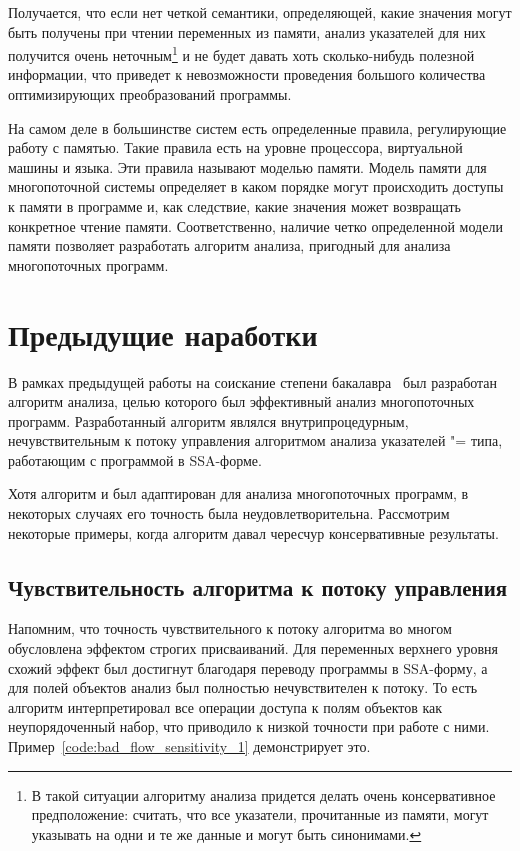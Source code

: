 \documentclass[14pt,titlepage,draft]{extarticle}
\newcommand{\java}{\eng{Java}\xspace}
\newcommand{\subsetbased}{\eng{subset}"=\eng{based}\xspace}
\begin{document}
    Получается, что если нет четкой семантики, определяющей, какие значения
    могут быть получены при чтении переменных из памяти, анализ указателей
    для них получится очень неточным\footnote{
      В такой ситуации алгоритму анализа придется делать очень консервативное
      предположение: считать, что все указатели, прочитанные из памяти, могут
      указывать на одни и те же данные и могут быть синонимами.
    } и не будет давать хоть сколько-нибудь полезной информации, что приведет
    к невозможности проведения большого количества оптимизирующих
    преобразований программы.

    На самом деле в большинстве систем есть определенные правила,
    регулирующие работу с памятью. Такие правила есть на уровне процессора,
    виртуальной машины и языка. Эти правила называют моделью памяти.
    Модель памяти для многопоточной системы определяет в каком
    порядке могут происходить доступы к памяти в программе и, как следствие,
    какие значения может возвращать конкретное чтение памяти. Соответственно,
    наличие четко определенной модели памяти позволяет разработать алгоритм
    анализа, пригодный для анализа многопоточных программ.

  \section{Предыдущие наработки}
    
    В рамках предыдущей работы на соискание степени
    бакалавра~\cite{my_bachelor} был разработан алгоритм анализа, целью
    которого был эффективный анализ многопоточных \java программ.
    Разработанный алгоритм являлся внутрипроцедурным, нечувствительным к
    потоку управления алгоритмом анализа указателей \subsetbased типа,
    работающим с программой в SSA-форме.

    Хотя алгоритм и был адаптирован для анализа многопоточных программ, в
    некоторых случаях его точность была неудовлетворительна. Рассмотрим
    некоторые примеры, когда алгоритм давал чересчур консервативные
    результаты.

    \subsection{Чувствительность алгоритма к потоку управления}

      Напомним, что точность чувствительного к потоку алгоритма во многом
      обусловлена эффектом строгих присваиваний. Для переменных верхнего уровня
      схожий эффект был достигнут благодаря переводу программы в SSA-форму, а
      для полей объектов анализ был полностью нечувствителен к потоку. То есть
      алгоритм интерпретировал все операции доступа к полям объектов как
      неупорядоченный набор, что приводило к низкой точности при работе с ними.
      Пример~\ref{code:bad_flow_sensitivity_1} демонстрирует это.
\end{document}
